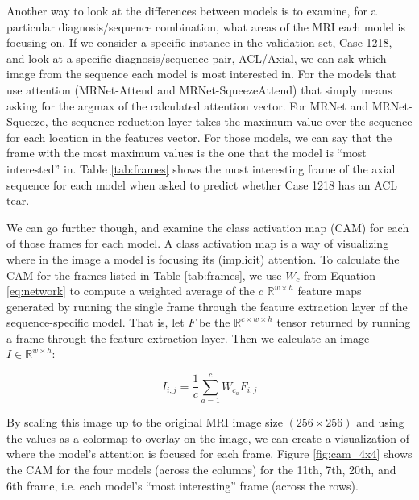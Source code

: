 \documentclass[10pt,twocolumn,letterpaper]{article}
\begin{document}
Another way to look at the differences between models is to examine, for a particular diagnosis/sequence combination, what areas of the MRI each model is focusing on. If we consider a specific instance in the validation set, Case 1218, and look at a specific diagnosis/sequence pair, ACL/Axial, we can ask which image from the sequence each model is most interested in. For the models that use attention (MRNet-Attend and MRNet-SqueezeAttend) that simply means asking for the argmax of the calculated attention vector. For MRNet and MRNet-Squeeze, the sequence reduction layer takes the maximum value over the sequence for each location in the features vector. For those models, we can say that the frame with the most maximum values is the one that the model is ``most interested'' in. Table \ref{tab:frames} shows the most interesting frame of the axial sequence for each model when asked to predict whether Case 1218 has an ACL tear.

We can go further though, and examine the class activation map (CAM) for each of those frames for each model. A class activation map is a way of visualizing where in the image a model is focusing its (implicit) attention\cite{zhou2016learning}. To calculate the CAM for the frames listed in Table \ref{tab:frames}, we use $W_c$ from Equation \ref{eq:network} to compute a weighted average of the $c$ $\mathbb{R}^{w \times h}$ feature maps generated by running the single frame through the feature extraction layer of the sequence-specific model. That is, let $F$ be the $\mathbb{R}^{c \times w \times h}$ tensor returned by running a frame through the feature extraction layer. Then we calculate an image $I \in \mathbb{R}^{w \times h}$:

$$I_{i,j} = \frac{1}{c} \sum_{a=1}^c W_{c_a} F_{i, j}$$

By scaling this image up to the original MRI image size $(256 \times 256)$ and using the values as a colormap to overlay on the image, we can create a visualization of where the model's attention is focused for each frame. Figure \ref{fig:cam_4x4} shows the CAM for the four models (across the columns) for the 11th, 7th, 20th, and 6th frame, i.e. each model's ``most interesting'' frame (across the rows).
\end{document}
